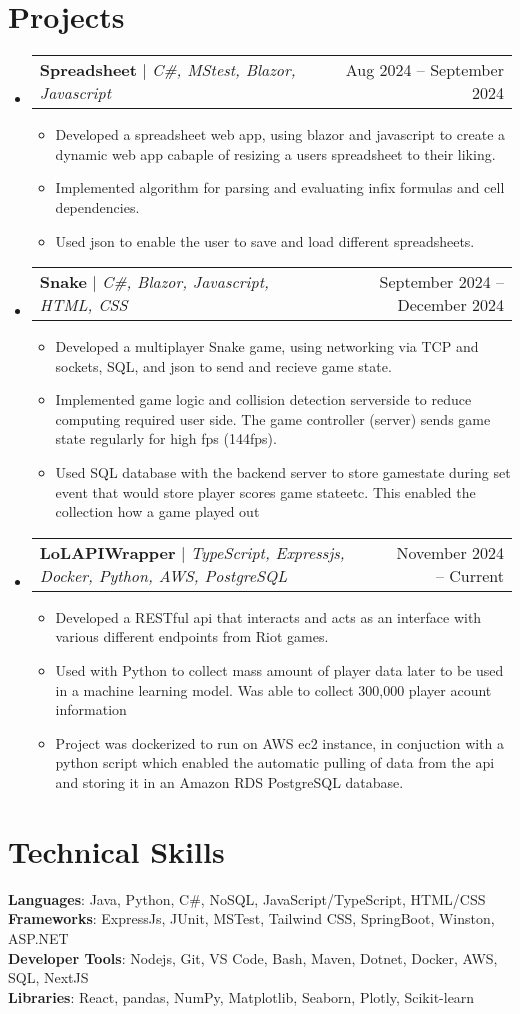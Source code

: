 \documentclass[letterpaper,11pt]{article}
\makeatletter
\newcommand{\resumeItem}[1]{
  \item\small{
    {#1 \vspace{-2pt}}
  }
}
\newcommand{\resumeProjectHeading}[2]{
    \item
    \begin{tabular*}{0.97\textwidth}{l@{\extracolsep{\fill}}r}
      \small#1 & #2 \\
    \end{tabular*}\vspace{-7pt}
}
\newcommand{\resumeSubHeadingListStart}{\begin{itemize}[leftmargin=0.15in, label={}]}
\newcommand{\resumeSubHeadingListEnd}{\end{itemize}}
\newcommand{\resumeItemListStart}{\begin{itemize}}
\newcommand{\resumeItemListEnd}{\end{itemize}\vspace{-5pt}}
\makeatother
\begin{document}
\section{Projects}
    \resumeSubHeadingListStart
      \resumeProjectHeading
          {\textbf{Spreadsheet} $|$ \emph{C\#, MStest, Blazor, Javascript}}{Aug 2024 -- September 2024}
          \resumeItemListStart
            \resumeItem{Developed a spreadsheet web app, using blazor and javascript to create a dynamic web app cabaple of resizing a users spreadsheet to their liking.}
            \resumeItem{Implemented algorithm for parsing and evaluating infix formulas and cell dependencies.}
            \resumeItem{Used json to enable the user to save and load different spreadsheets.}
          \resumeItemListEnd
      \resumeProjectHeading
          {\textbf{Snake} $|$ \emph{C\#, Blazor, Javascript, HTML, CSS}}{September 2024 -- December 2024}
          \resumeItemListStart
            \resumeItem{Developed a multiplayer Snake game, using networking via TCP and sockets, SQL, and json to send and recieve game state.}
            \resumeItem{Implemented game logic and collision detection serverside to reduce computing required user side. The game controller (server) sends game state regularly for high fps (144fps).}
            \resumeItem{Used SQL database with the backend server to store gamestate during set event that would store player scores game stateetc. This enabled the collection how a game played out}
          \resumeItemListEnd
      \resumeProjectHeading
          {\textbf{LoLAPIWrapper} $|$ \emph{TypeScript, Expressjs, Docker, Python, AWS, PostgreSQL }}{November 2024 -- Current}
          \resumeItemListStart
            \resumeItem{Developed a RESTful api that interacts and acts as an interface with various different endpoints from Riot games.}
            \resumeItem{Used with Python to collect mass amount of player data later to be used in a machine learning model. Was able to collect 300,000 player acount information}
            \resumeItem{Project was dockerized to run on AWS ec2 instance, in conjuction with a python script which enabled the automatic pulling of data from the api and storing it in an Amazon RDS PostgreSQL database. }
          \resumeItemListEnd
    \resumeSubHeadingListEnd



%
\section{Technical Skills}
 \begin{itemize}[leftmargin=0.15in, label={}]
    \small{\item{
     \textbf{Languages}{: Java, Python, C\#, NoSQL, JavaScript/TypeScript, HTML/CSS} \\
     \textbf{Frameworks}{: ExpressJs, JUnit, MSTest, Tailwind CSS, SpringBoot, Winston, ASP.NET} \\
     \textbf{Developer Tools}{: Nodejs, Git, VS Code, Bash, Maven, Dotnet, Docker, AWS, SQL, NextJS} \\
     \textbf{Libraries}{: React, pandas, NumPy, Matplotlib, Seaborn, Plotly, Scikit-learn}
    }}
 \end{itemize}


\end{document}
